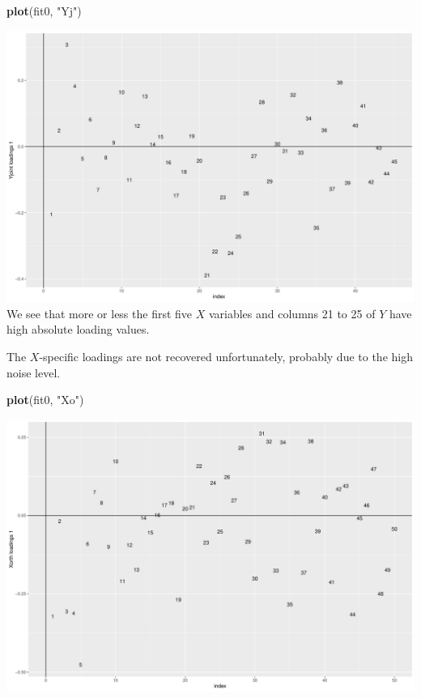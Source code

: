 \documentclass[]{article}
\newenvironment{Shaded}{\begin{snugshade}}{\end{snugshade}}
\newcommand{\KeywordTok}[1]{\textcolor[rgb]{0.13,0.29,0.53}{\textbf{#1}}}
\newcommand{\NormalTok}[1]{#1}
\newcommand{\StringTok}[1]{\textcolor[rgb]{0.31,0.60,0.02}{#1}}
\begin{document}
\begin{Shaded}
\begin{Highlighting}[]
\KeywordTok{plot}\NormalTok{(fit0, }\StringTok{"Yj"}\NormalTok{)}
\end{Highlighting}
\end{Shaded}

\includegraphics{Figs/unnamed-chunk-5-2.pdf} We see that more or less
the first five \(X\) variables and columns 21 to 25 of \(Y\) have high
absolute loading values.

The \(X\)-specific loadings are not recovered unfortunately, probably
due to the high noise level.

\begin{Shaded}
\begin{Highlighting}[]
\KeywordTok{plot}\NormalTok{(fit0, }\StringTok{"Xo"}\NormalTok{)}
\end{Highlighting}
\end{Shaded}

\includegraphics{Figs/unnamed-chunk-6-1.pdf}
\end{document}
